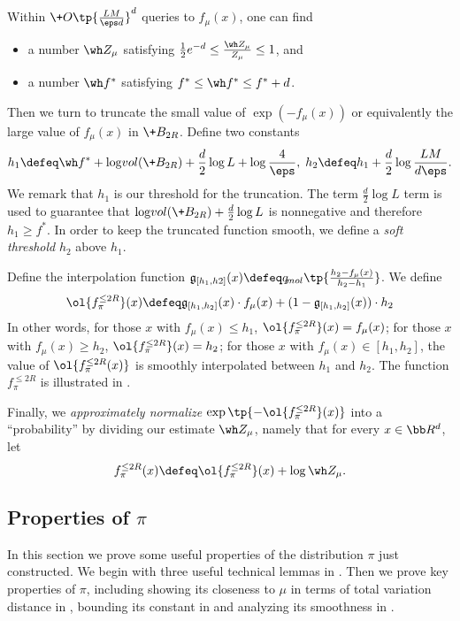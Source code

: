\begin{proposition} \label{prop:Z-and-fmin}
    Within $\+O\tp{\frac{LM}{\eps d}}^d$ queries to $f_\mu(x)$, one can find
    \begin{itemize}
        \item a number $\wh Z_\mu$ satisfying $\frac12 e^{-d}\le \frac{\wh Z_\mu}{Z_\mu}\le 1$, and
        \item a number $\wh f^*$ satisfying $f^*\le \wh f^*\le f^*+d$.
    \end{itemize}    
\end{proposition}

Then we turn to truncate the small value of $\exp(-f_\mu(x))$ or equivalently the large value of $f_\mu(x)$ in $\+B_{2R}$. Define two constants
\[
    h_1 \defeq \wh f^* +\log\!{vol}(\+B_{2R}) + \frac{d}{2}\log L+\log\frac{4}{\eps},\; h_2 \defeq h_1+\frac{d}{2}\log\frac{LM}{d\eps}.
\]
We remark that $h_1$ is our threshold for the truncation. The term $\frac{d}{2}\log L$ term is used to guarantee that $\log\!{vol}(\+B_{2R}) + \frac{d}{2}\log L$ is nonnegative and therefore $h_1\ge f^*$. In order to keep the truncated function smooth, we define a \emph{soft threshold} $h_2$ above $h_1$. 

Define the interpolation function $\mathfrak{g}_{[h_1,h2]}(x) \defeq q_{\!{mol}}\tp{\frac{h_2-f_{\mu}(x)}{h_2-h_1}}$. We define
\[
    \ol{f_{\pi}^{\le 2R}}(x)\defeq \mathfrak{g}_{[h_1,h_2]}(x)\cdot f_\mu(x) + (1-\mathfrak{g}_{[h_1,h_2]}(x))\cdot h_2
\]
In other words, for those $x$ with $f_\mu(x)\le h_1$, $\ol{f_{\pi}^{\le 2R}}(x) = f_\mu(x)$; for those $x$ with $f_\mu(x)\ge h_2$, $\ol{f_{\pi}^{\le 2R}}(x) = h_2$; for those $x$ with $f_\mu(x)\in [h_1,h_2]$, the value of $\ol{f_{\pi}^{\le 2R}(x)}$ is smoothly interpolated between $h_1$ and $h_2$. The function $f_\pi^{\le 2R}$ is illustrated in . %

Finally, we \emph{approximately normalize} $\exp\tp{-\ol{f_{\pi}^{\le 2R}}(x)}$ into a ``probability'' by dividing our estimate $\wh Z_\mu$, namely that for every $x\in \bb R^d$, let
\[
    f^{\le 2R}_\pi(x) \defeq \ol{f^{\le 2R}_\pi}(x) + \log \wh Z_{\mu}.
\]


\subsection{Properties of $\pi$}\label{sec:properties-of-pi}

In this section we prove some useful properties of the distribution $\pi$ just constructed. We begin with three useful technical lemmas in . Then we prove key properties of $\pi$, including showing its closeness to $\mu$ in terms of total variation distance in , bounding its \Poincare constant in  and analyzing its smoothness in .

